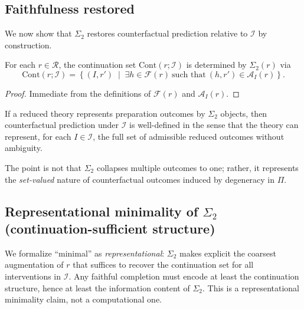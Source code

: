 \subsection{Faithfulness restored}

We now show that $\Sigma_2$ restores counterfactual prediction relative to $\mathcal{I}$ by construction.

\begin{proposition}
\label{prop:sigma2-determines-cont}
For each $r\in\mathcal{R}$, the continuation set $\mathrm{Cont}(r;\mathcal{I})$ is determined by
$\Sigma_2(r)$ via
\begin{equation}
\mathrm{Cont}(r;\mathcal{I})
=
\left\{
(I,r') \;\middle|\; \exists h\in\mathcal{F}(r)\ \text{such that}\ (h,r')\in\mathcal{A}_I(r)
\right\}.
\end{equation}
\end{proposition}

\begin{proof}
Immediate from the definitions of $\mathcal{F}(r)$ and $\mathcal{A}_I(r)$.
\end{proof}

\begin{corollary}
\label{cor:sigma2-counterfactual}
If a reduced theory represents preparation outcomes by $\Sigma_2$ objects, then counterfactual
prediction under $\mathcal{I}$ is well-defined in the sense that the theory can represent,
for each $I\in\mathcal{I}$, the full set of admissible reduced outcomes without ambiguity.
\end{corollary}

The point is not that $\Sigma_2$ collapses multiple outcomes to one; rather, it represents the
\emph{set-valued} nature of counterfactual outcomes induced by degeneracy in $\Pi$.

\subsection{Representational minimality of \texorpdfstring{$\Sigma_2$}{Sigma-2} (continuation-sufficient structure)}

We formalize ``minimal'' as \emph{representational}: $\Sigma_2$ makes explicit the coarsest
augmentation of $r$ that suffices to recover the continuation set for all interventions in
$\mathcal{I}$. Any faithful completion must encode at least the continuation structure, hence
at least the information content of $\Sigma_2$. This is a representational minimality claim,
not a computational one.

